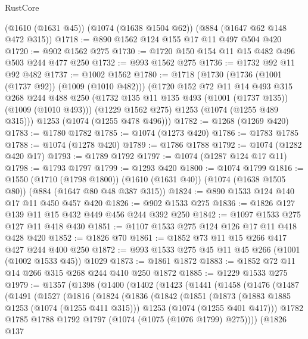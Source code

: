 \begin{lexlean}{RustCore}
\begin{coremodule}
    (@1610 (@1631 @45))
    (@1074 (@1638 @1504 @62))
    (@884 (@1647 @62 @148 @472 @315))
@1718 := @890 @1562 @124 @155 @17 @11 @497 @504 @420
@1720 := @902 @1562 @275
@1730 := @1720 @150 @154 @11 @15 @482 @496 @503 @244 @477 @250
@1732 := @993 @1562 @275
@1736 := @1732 @92 @11 @92 @482
@1737 := @1002 @1562
@1780 := @1718
    (@1730
      (@1736 (@1001 (@1737 @92)) (@1009 (@1010 @482)))
      (@1720
        @152
        @72
        @11
        @14
        @493
        @315
        @268
        @244
        @488
        @250
        (@1732 @135 @11 @135 @493 (@1001 (@1737 @135)) (@1009 (@1010 @493)))
        (@1229 @1562 @275)
        @1253
        (@1074 (@1255 @489 @315)))
      @1253
      (@1074 (@1255 @478 @496)))
@1782 := @1268 (@1269 @420)
@1783 := @1780 @1782
@1785 := @1074 (@1273 @420)
@1786 := @1783 @1785
@1788 := @1074 (@1278 @420)
@1789 := @1786 @1788
@1792 := @1074 (@1282 @420 @17)
@1793 := @1789 @1792
@1797 := @1074 (@1287 @124 @17 @11)
@1798 := @1793 @1797
@1799 := @1293 @420
@1800 := @1074 @1799
@1816 := @1550
    (@1710 (@1798 @1800))
    (@1610 (@1631 @40))
    (@1074 (@1638 @1505 @80))
    (@884 (@1647 @80 @48 @387 @315))
@1824 := @890 @1533 @124 @140 @17 @11 @450 @457 @420
@1826 := @902 @1533 @275
@1836 := @1826 @127 @139 @11 @15 @432 @449 @456 @244 @392 @250
@1842 := @1097 @1533 @275 @127 @11 @418 @430
@1851 := @1107 @1533 @275 @124 @126 @17 @11 @418 @428 @420
@1852 := @1826 @70
@1861 := @1852 @73 @11 @15 @266 @417 @427 @244 @400 @250
@1872 := @993 @1533 @275 @45 @11 @45 @266 (@1001 (@1002 @1533 @45)) @1029
@1873 := @1861 @1872
@1883 := @1852 @72 @11 @14 @266 @315 @268 @244 @410 @250 @1872
@1885 := @1229 @1533 @275
@1979 := @1357
    (@1398
      (@1400
        (@1402
          (@1423
            (@1441
              (@1458
                (@1476
                  (@1487
                    (@1491
                      (@1527
                        (@1816
                          (@1824
                            (@1836
                              (@1842
                                (@1851
                                  (@1873
                                    (@1883 @1885 @1253 (@1074 (@1255 @411 @315)))
                                    @1253
                                    (@1074 (@1255 @401 @417)))
                                  @1782
                                  @1785
                                  @1788
                                  @1792
                                  @1797
                                  (@1074 (@1075 (@1076 @1799) @275))))
                              (@1826
                                @137

\end{coremodule}
\end{lexlean}

